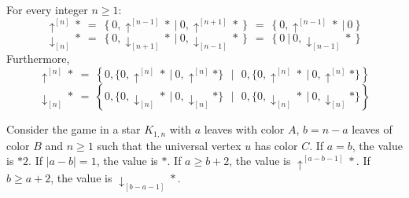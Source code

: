 \documentclass[10pt,a4paper]{amsart}
\begin{document}
\begin{theorem}\label{thm-basic2}
For every integer $n\geq 1$:
$$\uparrow^{[n]}*\ =\ \left\{0, \uparrow^{[n-1]}*\ \big|\ 0, \uparrow^{[n+1]}*\right\}\ =\ \left\{0,  \uparrow^{[n-1]}*\ \big|\ 0\right\}$$
$$\downarrow_{[n]}*\ =\ \left\{0,\downarrow_{[n+1]}*\ \big|\ 0, \downarrow_{[n-1]}*\right\}\ =\ \left\{0\ \big|\ 0, \downarrow_{[n-1]}*\right\}$$
Furthermore,
$$\uparrow^{[n]}*\ =\ \left\{0,\{0,\uparrow^{[n]}*\ |\ 0,\uparrow^{[n]}*\}\ \ \ \Big|\ \ \ 0,\{0,\uparrow^{[n]}*\ |\ 0,\uparrow^{[n]}*\}\right\}$$
$$\downarrow_{[n]}*\ =\ \left\{0,\{0,\downarrow_{[n]}*\ |\ 0,\downarrow_{[n]}*\}\ \ \ \Big|\ \ \ 0,\{0,\downarrow_{[n]}*\ |\ 0,\downarrow_{[n]}*\}\right\}$$
\end{theorem}

\begin{theorem}\label{thm-star3}
Consider the game in a star $K_{1,n}$ with $a$ leaves with color $A$, $b=n-a$ leaves of color $B$ and $n\geq 1$ such that the universal vertex $u$ has color $C$.
If $a=b$, the value is $*2$. If $|a-b|=1$, the value is $*$.
If $a\geq b+2$, the value is $\uparrow^{[a-b-1]}*$.
If $b\geq a+2$, the value is $\downarrow_{[b-a-1]}*$.
\end{theorem}
\end{document}
